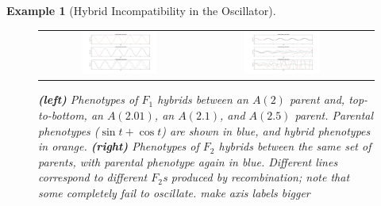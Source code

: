 \documentclass{article}
\newcommand{\plr}[1]{\todo[color=blue!25]{#1}}
\newcommand{\plri}[1]{{\color{blue}\it #1}}
\newcommand{\plr}[1]{{\color{blue}\it #1}}
\newcommand{\plri}[1]{\plr{#1}}
\newcommand{\1}{\mathbbm{1}}
\newtheorem{example}{Example}
\begin{document}
\begin{example}[Hybrid Incompatibility in the Oscillator]
\begin{figure}[H]
  \centering
  \begin{tabular}{ccc}
    \includegraphics[width=0.5\textwidth, height=0.25\paperheight]{F1_comparison} &
    \includegraphics[width=0.5\textwidth, height=0.25\paperheight]{F2s_comparison2}
  \end{tabular}
  \caption{
  \textbf{(left)} Phenotypes of $F_1$ hybrids between an $A(2)$ parent and, top-to-bottom, an $A(2.01)$, an $A(2.1)$, and $A(2.5)$ parent.
    Parental phenotypes ($\sin t + \cos t$) are shown in blue, and hybrid phenotypes in orange.
    \textbf{(right)} Phenotypes of $F_2$ hybrids between the same set of parents,
    with parental phenotype again in blue.
    Different lines correspond to different $F_2$s produced by recombination;
    note that some completely fail to oscillate.
    \plri{make axis labels bigger}
  } \label{fig:hybs}
\end{figure}


\end{example}
\end{document}

